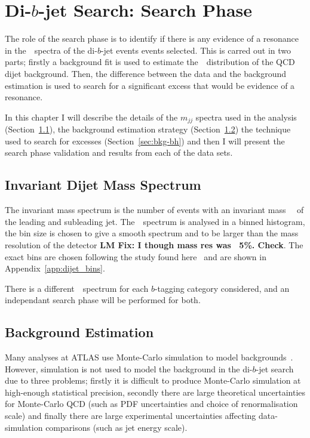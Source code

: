 \chapter{Di-$b$-jet Search: Search Phase}
\label{sec:bkg}

The role of the search phase is to identify
if there is any evidence of a resonance
in the~\mjj~spectra of the di-$b$-jet events events selected.
This is carred out in two parts;
firstly a background fit is used to estimate
the~\mjj~distribution of the QCD dijet background.
Then, the difference between the data
and the background estimation is used 
to search 
for a significant excess that would be evidence
of a resonance.

In this chapter
I will describe
the details of the $m_{jj}$ spectra used in the analysis
(Section~\ref{sec:bkg-mjj}),
the background estimation strategy
(Section~\ref{sec:bkg-fit})
the technique used to search for excesses
(Section~\ref{sec:bkg-bh})
and then I will present the search phase
validation and results from each of the data sets.

\section{Invariant Dijet Mass Spectrum}
\label{sec:bkg-mjj}

The invariant mass spectrum is the number of events
with an invariant mass~\mjj~
of the leading and subleading jet.
The~\mjj~spectrum is analysed in a binned histogram,
the bin size is chosen to give a smooth spectrum
and to be larger than the mass resolution of the detector \textbf{LM Fix: I though mass res was ~5\%. Check}.
The exact bins are chosen following the study found here~\cite{dijet-mori16_int}
and are shown in Appendix~\ref{app:dijet_bins}.

There is a different~\mjj~spectrum for each
$b$-tagging category considered,
and an independant search phase will be performed for both.



\section{Background Estimation}
\label{sec:bkg-fit}

Many analyses at ATLAS use Monte-Carlo simulation
to model backgrounds~\cite{obj-Hbb}.
However, simulation is not used to model the
background in the di-$b$-jet search due to three problems;
firstly it is difficult to produce Monte-Carlo simulation at high-enough statistical precision,
secondly there are large theoretical uncertainties for Monte-Carlo QCD
(such as PDF uncertainties and choice of renormalisation scale)
and finally there are large experimental uncertainties affecting
data-simulation comparisons (such as jet energy scale).


